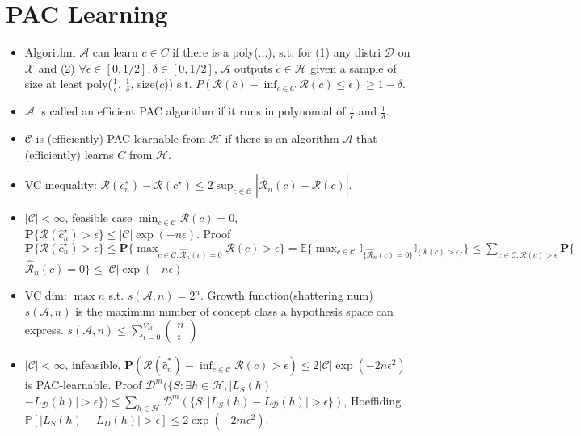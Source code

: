 \section{PAC Learning}

\begin{itemize}[itemsep=0pt,topsep=0pt, leftmargin=2pt, itemindent=5pt, labelwidth=5pt]
    \item Algorithm $\mathcal{A}$ can learn $c\in C$ if there is a poly(.,.), s.t. for (1) any distri $\mathcal{D}$ on $\mathcal{X}$ and (2) $\forall \epsilon\in [0, 1/2],\delta\in [0, 1/2]$, $\mathcal{A}$ outputs $\hat{c}\in \mathcal{H}$ given a sample of size at least poly($\frac{1}{\epsilon}$, $\frac{1}{\delta}$, size($c$)) s.t. $P(\mathcal{R}(\hat{c})-\inf_{c\in C}\mathcal{R}(c)\le\epsilon) \ge 1-\delta$.
    \item $\mathcal{A}$ is called an efficient PAC algorithm if it runs in polynomial of $\frac{1}{\epsilon}$ and $\frac{1}{\delta}$.
    \item $\mathcal{C}$ is (efficiently) PAC-learnable from $\mathcal{H}$ if there is an algorithm $\mathcal{A}$ that (efficiently) learns $C$ from $\mathcal{H}$.
    \item VC inequality: $\mathcal{R}(\hat{c}_{n}^{\star})-\mathcal{R}(c^{\star}) \leq 2 \sup _{c \in \mathcal{C}}|\hat{\mathcal{R}}_{n}(c)-\mathcal{R}(c)|$.
    \item $|\mathcal{C}|<\infty$, feasible case $\min _{c \in \mathcal{C}} \mathcal{R}(c)=0$, $\mathbf{P}\{\mathcal{R}(\hat{c}_{n}^{\star})>\epsilon\} \leq|\mathcal{C}| \exp (-n \epsilon)$. 
        Proof $\mathbf{P}\{\mathcal{R}(\hat{c}_{n}^{\star})>\epsilon\} \leq \mathbf{P}\{\max _{c \in \mathcal{C}: \hat{\mathcal{R}}_{n}(c)=0} \mathcal{R}(c)>\epsilon\} = \mathbb{E}\{\max _{c \in \mathcal{C}} \mathbb{I}_{\{\hat{\mathcal{R}}_{n}(c)=0\}} \mathbb{I}_{\{\mathcal{R}(c)>\epsilon\}}\}\leq \sum_{c \in \mathcal{C}: \mathcal{R}(c)>\epsilon} \mathbf{P}\{$\\$\hat{\mathcal{R}}_{n}(c)=0\} \leq|\mathcal{C}| \exp (-n \epsilon)$

    \item VC dim: $\max n$ s.t. $s(\mathcal{A}, n)=2^{n}$. Growth function(shattering num) $s(\mathcal{A}, n)$ is the maximum number of concept class a hypothesis space can express. $s(\mathcal{A}, n) \leq \sum_{i=0}^{V_{\mathcal{A}}}(\begin{array}{l}n \\i\end{array})$
    \item $|\mathcal{C}|<\infty$, infeasible, $\mathbf{P}(\mathcal{R}(\hat{c}_{n}^{*})-\inf _{c \in \mathcal{C}} \mathcal{R}(c)>\epsilon) \leq 2|\mathcal{C}| \exp (-2{n \epsilon^{2}})$  is PAC-learnable.
          Proof $\mathcal{D}^{m}(\{S: \exists h \in \mathcal{H},|L_{S}(h)$ $-L_{\mathcal{D}}(h)|>\epsilon\})\leq \sum_{h \in \mathcal{H}} \mathcal{D}^{m}(\{S:|L_{S}(h)-L_{\mathcal{D}}(h)|>\epsilon\})$, Hoeffiding $\mathbb{P}[|L_{S}(h)-L_{D}(h)|>\epsilon] \leq 2 \exp (-2 m \epsilon^{2})$.
\end{itemize}
